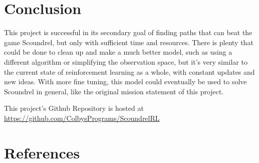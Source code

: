 \documentclass{article}
\begin{document}
\section{Conclusion}
This project is successful in its secondary goal of finding paths that can beat the game Scoundrel, but only with sufficient time and resources. There is plenty that could be done to clean up and make a much better model, such as using a different algorithm or simplifying the observation space, but it's very similar to the current state of reinforcement learning as a whole, with constant updates and new ideas. With more fine tuning, this model could eventually be used to solve Scoundrel in general, like the original mission statement of this project.

This project's Github Repository is hosted at\\ \url{https://github.com/ColbysPrograms/ScoundrelRL}

\section{References}
\printbibliography[heading=none]
\end{document}
